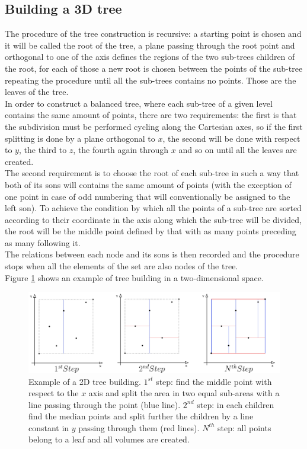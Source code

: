 \subsection{Building a 3D tree}
The procedure of the tree construction is recursive: a starting point is chosen and it will be called the root of the tree, a plane passing through the root point and orthogonal to one of the axis defines the regions of the two sub-trees children of the root, for each of those a new root is chosen between the points of the sub-tree repeating the procedure until all the sub-trees contains no points. Those are the leaves of the tree.\\
In order to construct a balanced tree, where each sub-tree of a given level contains the same amount of points, there are two requirements: the first is that the subdivision must be performed cycling along the Cartesian axes, so if the first splitting is done by a plane orthogonal to $x$, the second will be done with respect to $y$, the third to $z$, the fourth again through $x$ and so on until all the leaves are created.\\
The second requirement is to choose the root of each sub-tree in such a way that both of its sons will contains the same amount of points (with the exception of one point in case of odd numbering that will conventionally be assigned to the left son). To achieve the condition by which all the points of a sub-tree are sorted according to their coordinate in the axis along which the sub-tree will be divided, the root will be the middle point defined by that with as many points preceding as many following it.\\
The relations between each node and its sons is then recorded and the procedure stops when all the elements of the set are also nodes of the tree.\\
Figure \ref{kdtree_build} shows an example of tree building in a two-dimensional space.\\

\begin{figure}
\includegraphics[width=\textwidth]{volumeKdPlot/scheme_volume_kdtree.png}
\caption{Example of a 2D tree building. $1^{st}$ step: find the middle point with respect to the $x$ axis and split the area in two equal sub-areas with a line passing through the point (blue line). $2^{nd}$ step: in each children find the median points and split further the children by a line constant in $y$ passing through them (red lines). $N^{th}$ step: all points belong to a leaf and all volumes are created.}
\label{kdtree_build}
\end{figure}

